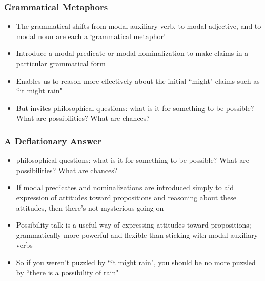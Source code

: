 \begin{frame}
\frametitle{Grammatical Metaphors}

\begin{itemize}[<+->]

\item The grammatical shifts from modal auxiliary verb, to modal adjective, and to modal noun are each a `grammatical metaphor'

\item Introduce a modal predicate or modal nominalization to make claims in a particular grammatical form

\item Enables us to reason more effectively about the initial ``might" claims such as ``it might rain"

\item But invites philosophical questions: what is it for something to be possible? What are possibilities? What are chances?

\end{itemize}
\end{frame}

\begin{frame}
\frametitle{A Deflationary Answer}

\begin{itemize}[<+->]

\item philosophical questions: what is it for something to be possible? What are possibilities? What are chances?

\item If modal predicates and nominalizations are introduced simply to aid expression of attitudes toward propositions and reasoning about these attitudes, then there's not mysterious going on

\item Possibility-talk is a useful way of expressing attitudes toward propositions; grammatically more powerful and flexible than sticking with modal auxiliary verbs 

\item So if you weren't puzzled by ``it might rain", you should be no more puzzled by ``there is a possibility of rain"

\end{itemize}
\end{frame}

